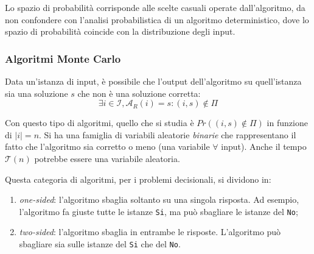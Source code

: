 Lo spazio di probabilità corrisponde alle scelte casuali operate dall'algoritmo, da 
non confondere con l'analisi probabilistica di un algoritmo deterministico, dove lo 
spazio di probabilità coincide con la distribuzione degli input.

\subsubsection*{Algoritmi Monte Carlo}
Data un'istanza di input, è possibile che l'output dell'algoritmo su quell'istanza 
sia una soluzione $s$ che non è una soluzione corretta:
\[
    \exists i \in \mathcal{I}, \mathcal{A}_{R}(i) = s:(i,s) \notin \Pi
\]

Con questo tipo di algoritmi, quello che si studia è $Pr((i,s) \notin \Pi)$ in 
funzione di $|i| = n$. Si ha una famiglia di variabili aleatorie \textit{binarie} che 
rappresentano il fatto che l'algoritmo sia corretto o meno (una variabile $\forall$ 
input). Anche il tempo $\mathcal{T}(n)$ potrebbe essere una variabile aleatoria.

Questa categoria di algoritmi, per i problemi decisionali, si dividono in:
\begin{enumerate}
    \item \textit{one-sided}: l'algoritmo sbaglia soltanto su una singola risposta. 
    Ad esempio, l'algoritmo fa giuste tutte le istanze \verb|Si|, ma può sbagliare 
    le istanze del \verb|No|;
    \item \textit{two-sided}: l'algoritmo sbaglia in entrambe le risposte. L'algoritmo 
    può sbagliare sia sulle istanze del \verb|Si| che del \verb|No|.
\end{enumerate}